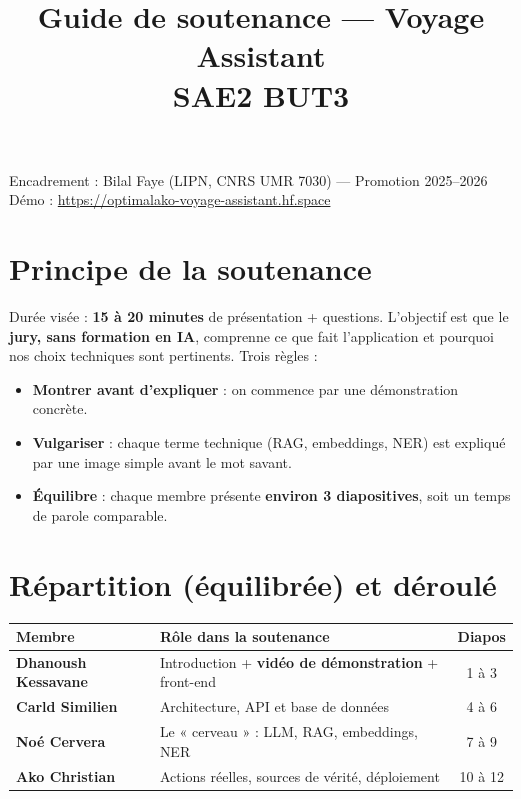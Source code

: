 \documentclass[11pt,a4paper]{article}
\title{\textbf{Guide de soutenance --- Voyage Assistant}\\[0.2cm]
\large SAE2 BUT3}
\author{}
\date{}
\begin{document}
\maketitle
\vspace{-1cm}

\begin{center}
\small Encadrement : Bilal Faye (LIPN, CNRS UMR 7030) --- Promotion 2025--2026\\
Démo : \url{https://optimalako-voyage-assistant.hf.space}
\end{center}

\tableofcontents
\newpage

\section{Principe de la soutenance}

Durée visée : \textbf{15 à 20 minutes} de présentation + questions. L'objectif est que
le \textbf{jury, sans formation en IA}, comprenne ce que fait l'application et pourquoi
nos choix techniques sont pertinents. Trois règles :

\begin{itemize}[nosep]
  \item \textbf{Montrer avant d'expliquer} : on commence par une démonstration concrète.
  \item \textbf{Vulgariser} : chaque terme technique (RAG, embeddings, NER) est expliqué
        par une image simple avant le mot savant.
  \item \textbf{Équilibre} : chaque membre présente \textbf{environ 3 diapositives}, soit
        un temps de parole comparable.
\end{itemize}

\section{Répartition (équilibrée) et déroulé}

\begin{center}
\renewcommand{\arraystretch}{1.3}
\begin{tabular}{>{\bfseries}l p{6.5cm} c}
\toprule
Membre & Rôle dans la soutenance & Diapos \\
\midrule
Dhanoush Kessavane & Introduction + \textbf{vidéo de démonstration} + front-end & 1 à 3 \\
Carld Similien & Architecture, API et base de données & 4 à 6 \\
Noé Cervera & Le « cerveau » : LLM, RAG, embeddings, NER & 7 à 9 \\
Ako Christian & Actions réelles, sources de vérité, déploiement & 10 à 12 \\
\bottomrule
\end{tabular}
\end{center}
\end{document}
